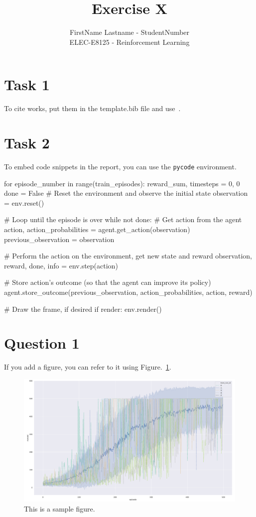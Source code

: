\documentclass[12pt]{article}
\begin{document}
 
\title{Exercise X}
\author{FirstName Lastname - StudentNumber\\
ELEC-E8125 - Reinforcement Learning}

\maketitle
\section{Task 1}
To cite works, put them in the template.bib file and use~\cite{sutton2018reinforcement}.

\section{Task 2}
To embed code snippets in the report, you can use the \texttt{pycode} environment.

\begin{pycode}
for episode_number in range(train_episodes):
    reward_sum, timesteps = 0, 0
    done = False
    # Reset the environment and observe the initial state
    observation = env.reset()

    # Loop until the episode is over
    while not done:
        # Get action from the agent
        action, action_probabilities = agent.get_action(observation)
        previous_observation = observation

        # Perform the action on the environment, get new state and reward
        observation, reward, done, info = env.step(action)

        # Store action's outcome (so that the agent can improve its policy)
        agent.store_outcome(previous_observation, action_probabilities, action, reward)

        # Draw the frame, if desired
        if render:
            env.render()
\end{pycode}

\section{Question 1}

If you add a figure, you can refer to it using Figure.~\ref*{fig:fig1}.

\begin{figure}[h] 
	\centering  %
    \includegraphics[width=0.9\columnwidth]{img/training.pdf}
	\caption{This is a sample figure.}
	\label{fig:fig1}
\end{figure}


\end{document}
